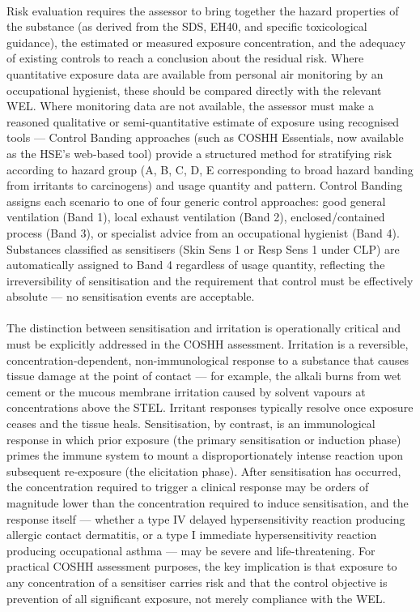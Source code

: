 \paragraph{}
Risk evaluation requires the assessor to bring together the hazard properties of the substance (as derived from the SDS, EH40, and specific toxicological guidance), the estimated or measured exposure concentration, and the adequacy of existing controls to reach a conclusion about the residual risk. Where quantitative exposure data are available from personal air monitoring by an occupational hygienist, these should be compared directly with the relevant WEL. Where monitoring data are not available, the assessor must make a reasoned qualitative or semi-quantitative estimate of exposure using recognised tools — Control Banding approaches (such as COSHH Essentials, now available as the HSE's web-based tool) provide a structured method for stratifying risk according to hazard group (A, B, C, D, E corresponding to broad hazard banding from irritants to carcinogens) and usage quantity and pattern. Control Banding assigns each scenario to one of four generic control approaches: good general ventilation (Band 1), local exhaust ventilation (Band 2), enclosed/contained process (Band 3), or specialist advice from an occupational hygienist (Band 4). Substances classified as sensitisers (Skin Sens 1 or Resp Sens 1 under CLP) are automatically assigned to Band 4 regardless of usage quantity, reflecting the irreversibility of sensitisation and the requirement that control must be effectively absolute — no sensitisation events are acceptable.

\paragraph{}
The distinction between sensitisation and irritation is operationally critical and must be explicitly addressed in the COSHH assessment. Irritation is a reversible, concentration-dependent, non-immunological response to a substance that causes tissue damage at the point of contact — for example, the alkali burns from wet cement or the mucous membrane irritation caused by solvent vapours at concentrations above the STEL. Irritant responses typically resolve once exposure ceases and the tissue heals. Sensitisation, by contrast, is an immunological response in which prior exposure (the primary sensitisation or induction phase) primes the immune system to mount a disproportionately intense reaction upon subsequent re-exposure (the elicitation phase). After sensitisation has occurred, the concentration required to trigger a clinical response may be orders of magnitude lower than the concentration required to induce sensitisation, and the response itself — whether a type IV delayed hypersensitivity reaction producing allergic contact dermatitis, or a type I immediate hypersensitivity reaction producing occupational asthma — may be severe and life-threatening. For practical COSHH assessment purposes, the key implication is that exposure to any concentration of a sensitiser carries risk and that the control objective is prevention of all significant exposure, not merely compliance with the WEL.

